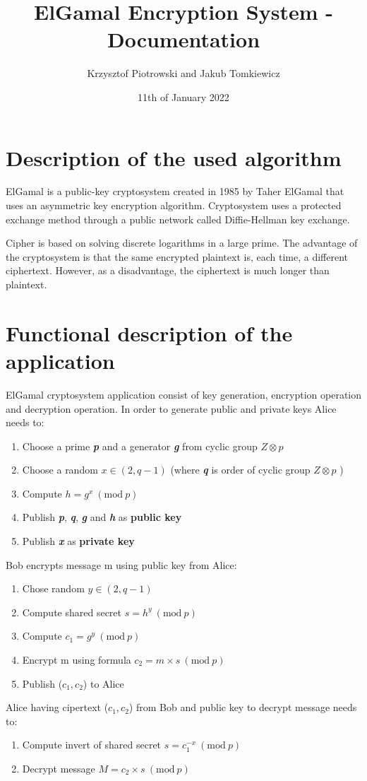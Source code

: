 \documentclass[a4paper,12pt]{article}
\newcommand{\Mod}[1]{\ (\mathrm{mod}\ #1)}
\begin{document}
\title{ElGamal Encryption System - Documentation }
\author{Krzysztof Piotrowski and Jakub Tomkiewicz}
\date{11th of January 2022}
\maketitle

\section{Description of the used algorithm}

ElGamal is a public-key cryptosystem created in 1985 by Taher ElGamal that uses an asymmetric key encryption algorithm. 
Cryptosystem uses a protected exchange method through a public network called Diffie-Hellman key exchange.

Cipher is based on solving discrete logarithms in a large prime. 
The advantage of the cryptosystem is that the same encrypted plaintext is, each time, a different ciphertext.
However, as a disadvantage, the ciphertext is much longer than plaintext.

\section{Functional description of the application}

ElGamal cryptosystem application consist of key generation, encryption operation and decryption operation.
In order to generate public and private keys Alice needs to:
\begin{enumerate}
\item   Choose a prime \textbf{\textit{p}} and a generator \textbf{\textit{g}} from cyclic group \textbf{\textit{$ Z\otimes p $}}
\item   Choose a random $x \in (2,q-1)$ (where \textbf{\textit{q}} is order of cyclic group \textbf{\textit{$ Z\otimes p $}} )
\item	Compute $ h = g^x \Mod p $
\item	Publish \textbf{\textit{p}}, \textbf{\textit{q}}, \textbf{\textit{g}} and \textbf{\textit{h}} as \textbf{public key}
\item   Publish \textbf{\textit{x}} as \textbf{private key}
\end{enumerate}
Bob encrypts message m using public key from Alice:
\begin{enumerate}
\item	Chose random $ y \in (2,q-1) $
\item	Compute shared secret $ s = h^y \Mod p$
\item	Compute $ c_1 = g^y \Mod p $
\item	Encrypt m using formula $ c_2 = m \times s \Mod p $
\item	Publish ($c_1, c_2$) to Alice
\end{enumerate}
Alice having cipertext ($c_1, c_2$) from Bob and public key to decrypt message needs to:
\begin{enumerate}
\item	Compute invert of shared secret $ s = c_1^{-x} \Mod p $
\item	Decrypt message  $ M = c_2 \times s \Mod p $
\end{enumerate}
\end{document}
